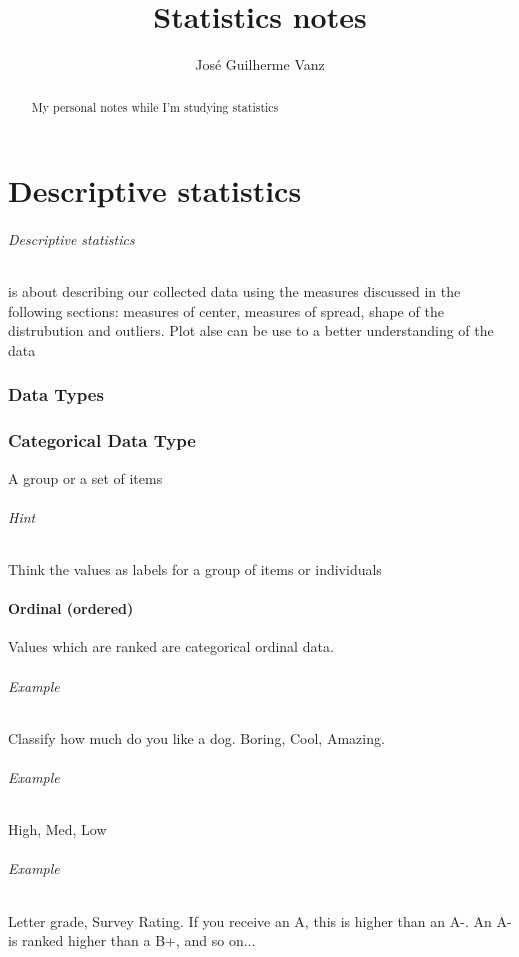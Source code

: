 \documentclass[]{article}
\title{Statistics notes}
\author{José Guilherme Vanz}
\begin{document}
\maketitle

\begin{abstract}
My personal notes while I'm studying statistics
\end{abstract}

\part{Descriptive statistics}
\paragraph{Descriptive statistics} is about describing our collected data using the measures discussed in the following sections: measures of center, measures of spread, shape of the distrubution and outliers. Plot alse can be use to a better understanding of the data
\section{Data Types}

\section{Categorical Data Type}
A group or a set of items
\paragraph{Hint} Think the values as labels for a group of items or individuals
\subsection{Ordinal (ordered)}
Values which are ranked are categorical ordinal data. 
\paragraph{Example} Classify how much do you like a dog. Boring, Cool, Amazing. 
\paragraph{Example} High, Med, Low
\paragraph{Example} Letter grade, Survey Rating. If you receive an A, this is higher than an A-. An A- is ranked higher than a B+, and so on...
\end{document}
